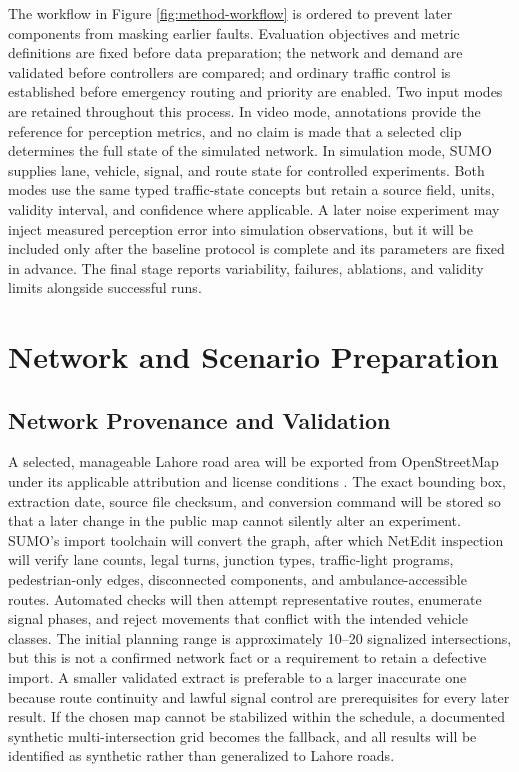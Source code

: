 The workflow in Figure \ref{fig:method-workflow} is ordered to prevent later components from masking earlier faults. Evaluation objectives and metric definitions are fixed before data preparation; the network and demand are validated before controllers are compared; and ordinary traffic control is established before emergency routing and priority are enabled. Two input modes are retained throughout this process. In video mode, annotations provide the reference for perception metrics, and no claim is made that a selected clip determines the full state of the simulated network. In simulation mode, SUMO supplies lane, vehicle, signal, and route state for controlled experiments. Both modes use the same typed traffic-state concepts but retain a source field, units, validity interval, and confidence where applicable. A later noise experiment may inject measured perception error into simulation observations, but it will be included only after the baseline protocol is complete and its parameters are fixed in advance. The final stage reports variability, failures, ablations, and validity limits alongside successful runs.

\section{Network and Scenario Preparation}

\subsection{Network Provenance and Validation}

A selected, manageable Lahore road area will be exported from OpenStreetMap under its applicable attribution and license conditions \cite{osmlicense}. The exact bounding box, extraction date, source file checksum, and conversion command will be stored so that a later change in the public map cannot silently alter an experiment. SUMO's import toolchain will convert the graph, after which NetEdit inspection will verify lane counts, legal turns, junction types, traffic-light programs, pedestrian-only edges, disconnected components, and ambulance-accessible routes. Automated checks will then attempt representative routes, enumerate signal phases, and reject movements that conflict with the intended vehicle classes. The initial planning range is approximately 10--20 signalized intersections, but this is not a confirmed network fact or a requirement to retain a defective import. A smaller validated extract is preferable to a larger inaccurate one because route continuity and lawful signal control are prerequisites for every later result. If the chosen map cannot be stabilized within the schedule, a documented synthetic multi-intersection grid becomes the fallback, and all results will be identified as synthetic rather than generalized to Lahore roads.


